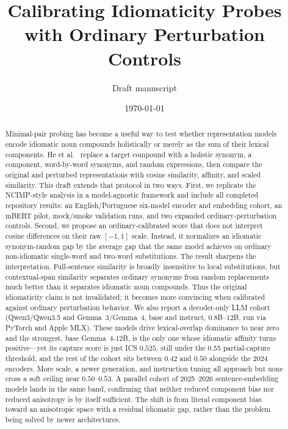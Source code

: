 \documentclass[11pt]{article}
\title{Calibrating Idiomaticity Probes with Ordinary Perturbation Controls}
\author{Draft manuscript}
\date{\today}
\begin{document}
\maketitle

\begin{abstract}
Minimal-pair probing has become a useful way to test whether representation models encode
idiomatic noun compounds holistically or merely as the sum of their lexical components. He
et al.~\cite{he2025idiomaticity} replace a target compound with a holistic synonym, a component,
word-by-word synonyms, and random expressions, then compare the original and perturbed
representations with cosine similarity, affinity, and scaled similarity. This draft extends that
protocol in two ways. First, we replicate the NCIMP-style analysis in a model-agnostic framework
and include all completed repository results: an English/Portuguese six-model encoder and embedding
cohort, an mBERT pilot, mock/smoke validation runs, and two expanded ordinary-perturbation controls.
Second, we propose an ordinary-calibrated score that does not interpret cosine differences on their
raw $[-1,1]$ scale. Instead, it normalizes an idiomatic synonym-random gap by the average gap that
the same model achieves on ordinary non-idiomatic single-word and two-word substitutions. The
result sharpens the interpretation. Full-sentence similarity is broadly insensitive to local
substitutions, but contextual-span similarity separates ordinary synonyms from random replacements
much better than it separates idiomatic noun compounds. Thus the original idiomaticity claim is not
invalidated; it becomes more convincing when calibrated against ordinary perturbation behavior.
We also report a decoder-only LLM cohort (Qwen3/Qwen3.5 and Gemma~3/Gemma~4, base and instruct,
0.8B--12B, run via PyTorch and Apple MLX). These models drive lexical-overlap dominance to near zero
and the strongest, base Gemma~4-12B, is the only one whose idiomatic affinity turns positive---yet
its capture score is just ICS $0.525$, still under the 0.55 partial-capture threshold, and the rest
of the cohort sits between $0.42$ and $0.50$ alongside the 2024 encoders. More scale, a newer
generation, and instruction tuning all approach but none cross a soft ceiling near $0.50$--$0.53$. A
parallel cohort of 2025--2026 sentence-embedding models lands in the same band, confirming that
neither reduced component bias nor reduced anisotropy is by itself sufficient. The shift is from
literal component bias toward an anisotropic space with a residual idiomatic gap, rather than the
problem being solved by newer architectures.
\end{abstract}
\end{document}
